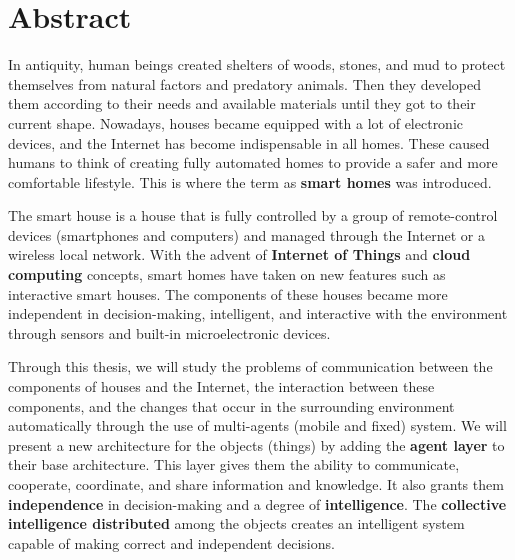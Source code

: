
\thispagestyle{plain}
\section*{Abstract}

In antiquity, human beings created shelters of woods, stones, and mud to protect themselves from natural factors and predatory animals. Then they developed them according to their needs and available materials until they got to their current shape.
Nowadays, houses became equipped with a lot of electronic devices, and the Internet has become indispensable in all homes. These caused humans to think of creating fully automated homes to provide a safer and more comfortable lifestyle. This is where the term as \textbf{smart homes} was introduced.

The smart house is a house that is fully controlled by a group of remote-control devices (smartphones and computers) and managed through the Internet or a wireless local network. With the advent of  \textbf{Internet of Things} and \textbf{cloud computing} concepts, smart homes have taken on new features such as interactive smart houses. The components of these houses became more independent in decision-making, intelligent, and interactive with the environment through sensors and built-in microelectronic devices.


Through this thesis, we will study the problems of communication between the components of houses and the Internet, the interaction between these components, and the changes that occur in the surrounding environment automatically through the use of multi-agents (mobile and fixed) system. We will present a new architecture for the objects (things) by adding the  \textbf{agent layer} to their base architecture. This layer gives them the ability to communicate, cooperate, coordinate, and share information and knowledge. It also grants them \textbf{independence} in decision-making and a degree of \textbf{intelligence}. The \textbf{collective intelligence distributed} among the objects creates an intelligent system capable of making correct and independent decisions.
